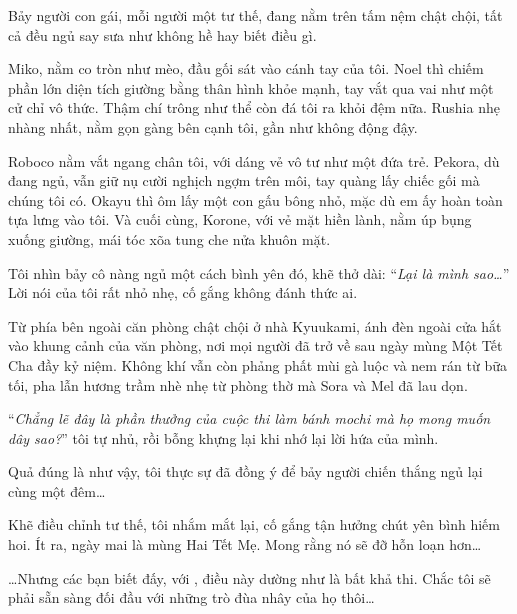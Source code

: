 \documentclass[../main.tex]{subfiles}
\begin{document}
Bảy người con gái, mỗi người một tư thế, đang nằm trên tấm nệm chật chội, tất cả đều ngủ say sưa như không hề hay biết điều gì.

Miko, nằm co tròn như mèo, đầu gối sát vào cánh tay của tôi. Noel thì chiếm phần lớn diện tích giường bằng thân hình khỏe mạnh, tay vắt qua vai như một cử chỉ vô thức. Thậm chí trông như thể còn đá tôi ra khỏi đệm nữa. Rushia nhẹ nhàng nhất, nằm gọn gàng bên cạnh tôi, gần như không động đậy.

Roboco nằm vắt ngang chân tôi, với dáng vẻ vô tư như một đứa trẻ. Pekora, dù đang ngủ, vẫn giữ nụ cười nghịch ngợm trên môi, tay quàng lấy chiếc gối mà chúng tôi có. Okayu thì ôm lấy một con gấu bông nhỏ, mặc dù em ấy hoàn toàn tựa lưng vào tôi. Và cuối cùng, Korone, với vẻ mặt hiền lành, nằm úp bụng xuống giường, mái tóc xõa tung che nửa khuôn mặt.

Tôi nhìn bảy cô nàng ngủ một cách bình yên đó, khẽ thở dài: ``\textit{Lại là mình sao\dots}'' Lời nói của tôi rất nhỏ nhẹ, cố gắng không đánh thức ai.

Từ phía bên ngoài căn phòng chật chội ở nhà Kyuukami, ánh đèn ngoài cửa hắt vào khung cảnh của văn phòng, nơi mọi người đã trở về sau ngày mùng Một Tết Cha đầy kỷ niệm. Không khí vẫn còn phảng phất mùi gà luộc và nem rán từ bữa tối, pha lẫn hương trầm nhè nhẹ từ phòng thờ mà Sora và Mel đã lau dọn.

``\textit{Chẳng lẽ đây là phần thưởng của cuộc thi làm bánh mochi mà họ mong muốn dây sao?}'' tôi tự nhủ, rồi bỗng khựng lại khi nhớ lại lời hứa của mình.

Quả đúng là như vậy, tôi thực sự đã đồng ý để bảy người chiến thắng ngủ lại cùng một đêm\dots

Khẽ điều chỉnh tư thế, tôi nhắm mắt lại, cố gắng tận hưởng chút yên bình hiếm hoi. Ít ra, ngày mai là mùng Hai Tết Mẹ. Mong rằng nó sẽ đỡ hỗn loạn hơn\dots

\dots Nhưng các bạn biết đấy, với \hll, điều này dường như là bất khả thi. Chắc tôi sẽ phải sẵn sàng đối đầu với những trò đùa nhây của họ thôi\dots
\end{document}
